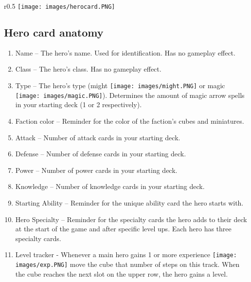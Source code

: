 \documentclass[12pt]{article}
\begin{document}
\clearpage

\begin{wrapfigure}{r}{0.5\textwidth}
\texttt{[image: images/herocard.PNG]} 
\end{wrapfigure}
\subsection*{\hypertarget{Herocard}{Hero card anatomy}}
\begin{enumerate}
\item Name – The hero’s name. Used for identification. Has no gameplay effect.
\item Class – The hero’s class. Has no gameplay effect.
\item Type – The hero’s type (might \texttt{[image: images/might.PNG]} or magic \texttt{[image: images/magic.PNG]}). Determines the amount of magic arrow spells in your starting deck (1 or 2 respectively).
\item Faction color – Reminder for the color of the faction’s cubes and miniatures.
\item Attack – Number of attack cards in your starting deck.
\item Defense – Number of defense cards in your starting deck.
\item Power – Number of power cards in your starting deck.
\item Knowledge – Number of knowledge cards in your starting deck.
\item Starting Ability – Reminder for the unique ability card the hero starts with.
\item Hero Specialty – Reminder for the specialty cards the hero adds to their deck at the start of the game and after specific level ups. Each hero has three specialty cards.
\item Level tracker - Whenever a main hero gains 1 or more experience \texttt{[image: images/exp.PNG]} move the cube that number of steps on this track. When the cube reaches the next slot on the upper row, the hero gains a level.
\end{enumerate}
\clearpage
\end{document}
